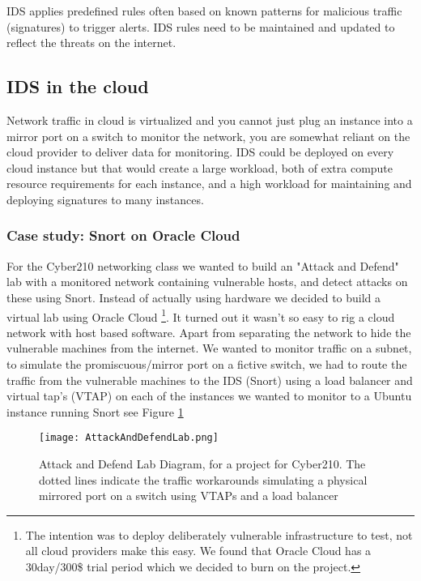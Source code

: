 \documentclass[
	letterpaper, %
	10pt, %
	unnumberedsections, %
	twoside, %
]{APAAssignment}
\begin{document}
IDS applies predefined rules often based on known patterns for malicious traffic (signatures) to trigger alerts. IDS rules need to be maintained and updated to reflect the threats on the internet.    

\subsection{IDS in the cloud}
Network traffic in cloud is virtualized and you cannot just plug an instance into a mirror port on a switch to monitor the network, you are somewhat reliant on the cloud provider to deliver data for monitoring. IDS could be deployed on every cloud instance but that would create a large workload, both of extra compute resource requirements for each instance, and a high workload for maintaining and deploying signatures to many instances.       

\subsubsection{Case study: Snort on Oracle Cloud}
For the Cyber210 networking class we wanted to build an "Attack and Defend" lab with a monitored network containing vulnerable hosts, and detect attacks on these using Snort. Instead of actually using hardware we decided to build a virtual lab using Oracle Cloud \footnote{The intention was to deploy deliberately
vulnerable infrastructure to test, not all cloud providers make this easy. We found that Oracle Cloud has a 30day/300\$ trial period which we decided to burn on the project.}. It turned out it wasn't so easy to rig a cloud network with host based software. Apart from separating the network to hide the vulnerable machines from the internet. We wanted to monitor traffic on a subnet, to simulate the promiscuous/mirror port on a fictive switch, we had to route the traffic from the vulnerable machines to the IDS (Snort) using a load balancer and virtual tap's (VTAP) on each of the instances we wanted to monitor to a Ubuntu instance running Snort see Figure \ref{fig:AttackAndDefendLab} 

\begin{figure}[!htp] %
	\centering
	\texttt{[image: AttackAndDefendLab.png]}
	\caption{Attack and Defend Lab Diagram, for a project for Cyber210. The dotted lines indicate the traffic workarounds simulating a physical mirrored port on a switch using VTAPs and a load balancer}
	\label{fig:AttackAndDefendLab}
\end{figure}
\end{document}
